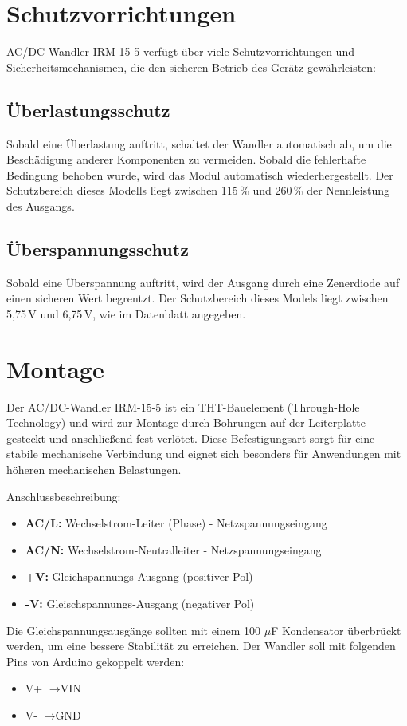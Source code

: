 \section{Schutzvorrichtungen}
	AC/DC-Wandler IRM-15-5 verfügt über viele Schutzvorrichtungen und Sicherheitsmechanismen, die den sicheren Betrieb des Gerätz gewährleisten:
	\subsection{Überlastungsschutz}
	Sobald eine Überlastung auftritt, schaltet der Wandler automatisch ab, um die Beschädigung anderer Komponenten zu vermeiden. Sobald die fehlerhafte Bedingung behoben wurde, wird das Modul automatisch wiederhergestellt. Der Schutzbereich dieses Modells liegt zwischen 115\,\% und 260\,\% der Nennleistung des Ausgangs.
	\subsection{Überspannungsschutz}
	Sobald eine Überspannung auftritt, wird der Ausgang durch eine Zenerdiode auf einen sicheren Wert begrentzt. Der Schutzbereich dieses Models liegt zwischen 5{,}75\,V und 6{,}75\,V, wie im Datenblatt angegeben.

\section{Montage}
Der AC/DC-Wandler IRM-15-5 ist ein THT-Bauelement (Through-Hole Technology) und wird zur Montage durch Bohrungen auf der Leiterplatte gesteckt und anschlie{\ss}end fest verlötet. Diese Befestigungsart sorgt für eine stabile mechanische Verbindung und eignet sich besonders für Anwendungen mit höheren mechanischen Belastungen.

Anschlussbeschreibung:
\begin{itemize}
	\item \textbf{AC/L:} Wechselstrom-Leiter (Phase) - Netzspannungseingang
	\item \textbf{AC/N:} Wechselstrom-Neutralleiter - Netzspannungseingang
	\item \textbf{+V:} Gleichspannungs-Ausgang (positiver Pol)
	\item \textbf{-V:} Gleischspannungs-Ausgang (negativer Pol)
\end{itemize}

Die Gleichspannungsausgänge sollten mit einem 100 \(\mu\)F Kondensator überbrückt werden, um eine bessere Stabilität zu erreichen. Der Wandler soll mit folgenden Pins von Arduino gekoppelt werden:
\begin{itemize}
	\item V+ \(\rightarrow \text{VIN}\)
	\item V- \(\rightarrow \text{GND}\)
\end{itemize}


